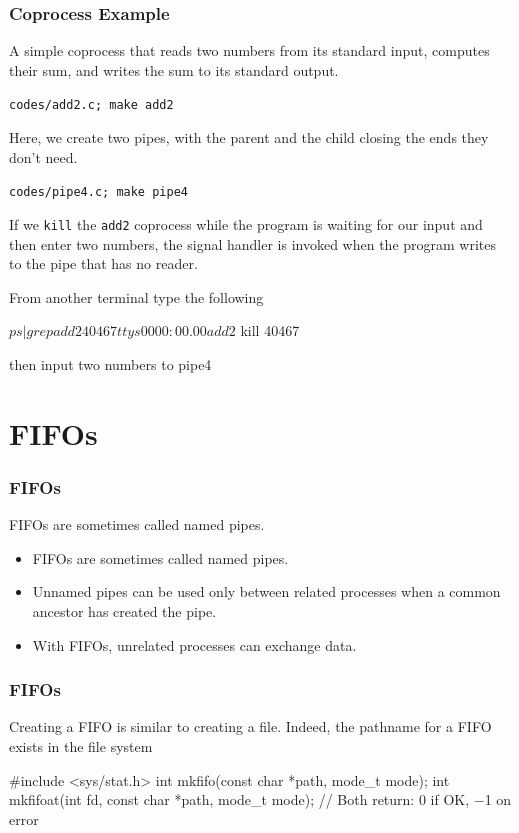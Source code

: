 \documentclass[newPxFont,sthlmFooter,nooffset]{beamer}
\begin{document}
\begin{frame}
  \frametitle{Coprocess Example}
A simple coprocess that reads two numbers from its standard input, computes their sum, and writes the sum to its standard output.

\texttt{codes/add2.c; make add2}

  

\bigskip

Here, we create two pipes, with the parent and the child closing the ends they don’t need. 

\newpage
\texttt{codes/pipe4.c; make pipe4}
  

\newpage
If we \texttt{kill} the \texttt{add2} coprocess while the program is waiting for our input and then enter two numbers, the signal handler is invoked when the program writes to the pipe that has no reader.

From another terminal type the following
\begin{codedefnb}
$ ps | grep add2
40467  ttys000  0:00.00 add2
$ kill 40467
\end{codedefnb}

then input two numbers to pipe4

\end{frame}

\section{FIFOs}

\begin{frame}[t]
  \frametitle{FIFOs}
FIFOs are sometimes called named pipes.
\begin{itemize}
\item FIFOs are sometimes called named pipes.
\item Unnamed pipes can be used only between related processes when a common ancestor has created the pipe.
\item With FIFOs, unrelated processes can exchange data.
\end{itemize}


\end{frame}



\begin{frame}[t, fragile]
  \frametitle{FIFOs}
Creating a FIFO is similar to creating a file. Indeed, the pathname for a FIFO exists in the file system
\begin{codedef}
 #include <sys/stat.h>
int mkfifo(const char *path, mode_t mode);
int mkfifoat(int fd, const char *path, mode_t mode);
// Both return: 0 if OK, −1 on error
\end{codedef}

\end{frame}
\end{document}
